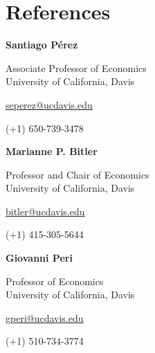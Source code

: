\documentclass[11pt]{article}
\newlength{\bodyindent}
\newcommand{\ulink}[2]{\href{#1}{\underline{#2}}}
\newcommand{\refentry}[4]{%
  \begin{minipage}[t]{0.30\textwidth}
    \textbf{#1}\par
    #2\par
    \ulink{mailto:#3}{#3}\par
    #4
  \end{minipage}%
}
\begin{document}
\section{References}
\noindent\hspace*{\bodyindent}%
\refentry{Santiago P\'erez}{Associate Professor of Economics\\University of California, Davis}{seperez@ucdavis.edu}{(+1) 650-739-3478}\hspace{0.02\textwidth}%
\refentry{Marianne P. Bitler}{Professor and Chair of Economics\\University of California, Davis}{bitler@ucdavis.edu}{(+1) 415-305-5644}\hspace{0.02\textwidth}%
\refentry{Giovanni Peri}{Professor of Economics\\University of California, Davis}{gperi@ucdavis.edu}{(+1) 510-734-3774}\par
\end{document}
